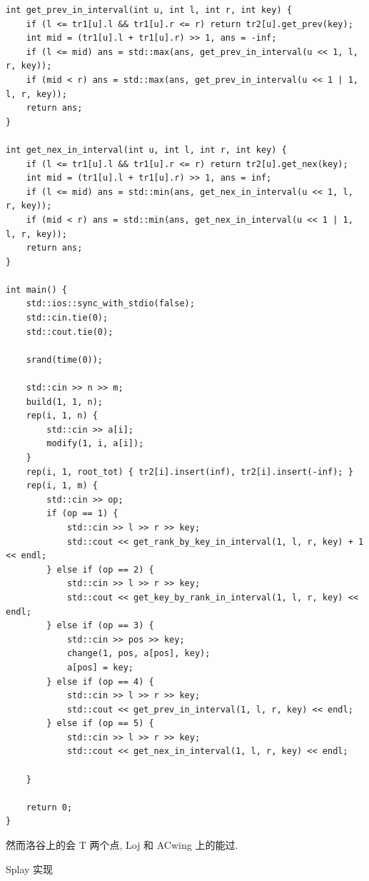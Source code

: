 \documentclass[UTF8, a4paper, titlepage, twoside]{ctexart}
\begin{document}
\begin{lstlisting}[style=cpp]
int get_prev_in_interval(int u, int l, int r, int key) {
    if (l <= tr1[u].l && tr1[u].r <= r) return tr2[u].get_prev(key);
    int mid = (tr1[u].l + tr1[u].r) >> 1, ans = -inf;
    if (l <= mid) ans = std::max(ans, get_prev_in_interval(u << 1, l, r, key));
    if (mid < r) ans = std::max(ans, get_prev_in_interval(u << 1 | 1, l, r, key));
    return ans;
}

int get_nex_in_interval(int u, int l, int r, int key) {
    if (l <= tr1[u].l && tr1[u].r <= r) return tr2[u].get_nex(key);
    int mid = (tr1[u].l + tr1[u].r) >> 1, ans = inf;
    if (l <= mid) ans = std::min(ans, get_nex_in_interval(u << 1, l, r, key));
    if (mid < r) ans = std::min(ans, get_nex_in_interval(u << 1 | 1, l, r, key));
    return ans;
}

int main() {
    std::ios::sync_with_stdio(false);
    std::cin.tie(0);
    std::cout.tie(0);

    srand(time(0));

    std::cin >> n >> m;
    build(1, 1, n);
    rep(i, 1, n) {
        std::cin >> a[i];
        modify(1, i, a[i]);
    }
    rep(i, 1, root_tot) { tr2[i].insert(inf), tr2[i].insert(-inf); }
    rep(i, 1, m) {
        std::cin >> op;
        if (op == 1) {
            std::cin >> l >> r >> key;
            std::cout << get_rank_by_key_in_interval(1, l, r, key) + 1 << endl;
        } else if (op == 2) {
            std::cin >> l >> r >> key;
            std::cout << get_key_by_rank_in_interval(1, l, r, key) << endl;
        } else if (op == 3) {
            std::cin >> pos >> key;
            change(1, pos, a[pos], key);
            a[pos] = key;
        } else if (op == 4) {
            std::cin >> l >> r >> key;
            std::cout << get_prev_in_interval(1, l, r, key) << endl;
        } else if (op == 5) {
            std::cin >> l >> r >> key;
            std::cout << get_nex_in_interval(1, l, r, key) << endl;
        
    }

    return 0;
}
\end{lstlisting}

然而洛谷上的会 T 两个点, Loj 和 ACwing 上的能过.

Splay 实现
\end{document}
